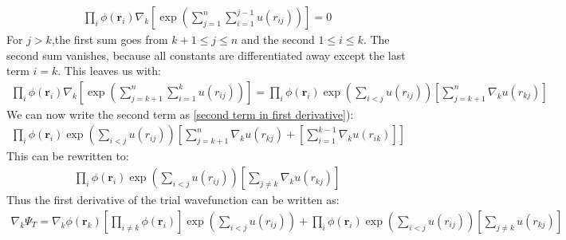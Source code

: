 \documentclass[a4paper, 10pt]{article}
\begin{document}
\begin{appendices}
\begin{align}
		\prod_{i}\phi(\boldsymbol{r}_{i})\nabla_{k}\left[\exp\left(\sum_{j = 1}^{n}\sum_{i = 1}^{j-1}u(r_{ij})\right)\right]
		= 0
		\end{align}
		For $j > k$,the first sum goes from $k+1\le j \le n$ and the second $1 \le i \le k$.  The second sum vanishes, because all constants are differentiated away
		except the last term $i = k$. This leaves us with:
		\begin{align}
		\prod_{i}\phi(\boldsymbol{r}_{i})\nabla_{k}\left[\exp\left(\sum_{j = k+1}^{n}\sum_{i = 1}^{k}u(r_{ij})\right)\right]
		= \prod_{i}\phi(\boldsymbol{r}_{i})
		\exp{\left(\sum_{i<j}u(r_{ij})\right)}
		\left[\sum_{j = k + 1}^{n}\nabla_{k}u(r_{kj})\right]
		\end{align}
		We can now write the second term as \ref{second term in first derivative}):
		\begin{align}\label{combined sum}
		\prod_{i}\phi(\boldsymbol{r}_{i})
		\exp{\left(\sum_{i<j}u(r_{ij})\right)}
		\left[\sum_{j = k + 1}^{n}\nabla_{k}u(r_{kj}) +
		\left[\sum_{i = 1}^{k-1}\nabla_{k}u(r_{ik})\right]\right]
		\end{align}
		This can be rewritten to:
		\begin{align}
		\prod_{i}\phi(\boldsymbol{r}_{i})
		\exp{\left(\sum_{i<j}u(r_{ij})\right)}
		\left[\sum_{j \neq k}\nabla_{k}u(r_{kj})\right]
		\end{align}
		Thus the first derivative of the trial wavefunction
		can be written as:
		\begin{align}
		\nabla_{k}\Psi_{T} =
		\nabla_k \phi(\mathbf{r}_k)\left[ \prod_{i\neq k} \phi(\mathbf{r}_i)\right]\exp\left(\sum_{i<j}u(r_{ij})\right)
		+ \prod_{i}\phi(\boldsymbol{r}_{i})
		\exp{\left(\sum_{i<j}u(r_{ij})\right)}
		\left[\sum_{j \neq k}u(r_{kj})\right]
		\end{align}

\end{appendices}
\end{document}
